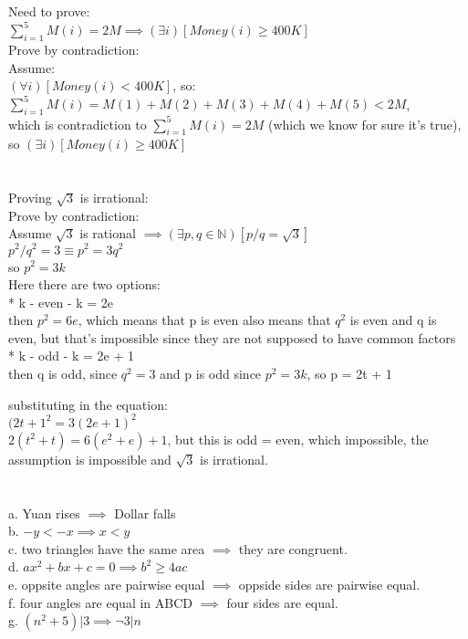 \documentclass{article}
\begin{document}
\section{}
Need to prove: \\
$\sum_{i=1}^{5}M(i) = 2M \implies (\exists i)[Money(i) \geq 400K]$\\
Prove by contradiction: \\
Assume:\\
$(\forall i)[Money(i) < 400K]$, so: \\
$\sum_{i=1}^{5}M(i) = M(1) + M(2) + M(3) + M(4) + M(5) < 2M$, \\
which is contradiction to $\sum_{i=1}^{5}M(i) = 2M$ (which we know for sure it's true),\\
so $(\exists i)[Money(i) \geq 400K]$\\

\section{}
Proving $\sqrt 3 $ is irrational: \\
Prove by contradiction: \\
Assume $\sqrt 3$ is rational $\implies (\exists p,q \in \mathbb{N})[p/q = \sqrt{3}]$ \\
$p^2/q^2 = 3 \equiv p^2 = 3q^2$ \\
so $p^2 = 3k$ \\
Here there are two options: \\
* k - even - k = 2e \\
then $p^2 = 6e$, which means that p is even
also means that $q^2$ is even and q is even, but that's impossible since they are not supposed to have common factors\\

* k - odd - k = 2e + 1\\
then q is odd, since $q^2 = 3$ and p is odd since $p^2 = 3k$, so p = 2t + 1

substituting in the equation:\\
$(2t+1^2 = 3(2e + 1)^2$\\
$2(t^2+t) = 6(e^2 + e) + 1$, but this is odd = even, which impossible, the assumption is impossible and $\sqrt{3}$ is irrational.

\section{}
a. Yuan rises $\implies$ Dollar falls\\
b. $-y < -x \implies x < y$\\
c. two triangles have the same area $\implies$ they are congruent.\\
d. $ax^2 + bx + c = 0 \implies b^2 \geq 4ac$\\
e. oppsite angles are pairwise equal $\implies$ oppside sides are pairwise equal.\\
f. four angles are equal in ABCD $\implies$ four sides are equal.\\
g. $(n^2 + 5)| 3 \implies \neg 3|n$
\end{document}
